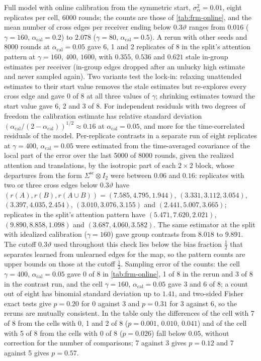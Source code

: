 \begin{numcheck}\label{chk:frm-online}
Full model with online calibration from the symmetric start, $\sigma_\alpha^2=0.01$, eight replicates per cell, 6000 rounds; the counts are those of \cref{tab:frm-online}, and the mean number of cross edges per receiver ending below $0.3\vartheta$ ranges from $0.016$ ($\gamma=160$, $\alpha_{\mathrm{cal}}=0.2$) to $2.078$ ($\gamma=80$, $\alpha_{\mathrm{cal}}=0.5$). A rerun with other seeds and 8000 rounds at $\alpha_{\mathrm{cal}}=0.05$ gave 6, 1 and 2 replicates of 8 in the split's attention pattern at $\gamma=160$, $400$, $1600$, with $0.355$, $0.536$ and $0.621$ stale in-group estimates per receiver (in-group edges dropped after an unlucky high estimate and never sampled again). Two variants test the lock-in: relaxing unattended estimates to their start value removes the stale estimates but re-explores every cross edge and gave 0 of 8 at all three values of $\gamma$; shrinking estimates toward the start value gave 6, 2 and 3 of 8. For independent residuals with two degrees of freedom the calibration estimate has relative standard deviation $(\alpha_{\mathrm{cal}}/(2-\alpha_{\mathrm{cal}}))^{1/2}\approx0.16$ at $\alpha_{\mathrm{cal}}=0.05$, and more for the time-correlated residuals of the model. Per-replicate contrasts in a separate run of eight replicates at $\gamma=400$, $\alpha_{\mathrm{cal}}=0.05$ were estimated from the time-averaged covariance of the local part of the error over the last 5000 of 8000 rounds, given the realized attention and translations, by the isotropic part of each $2\times2$ block, whose departures from the form $\Sigma^{\mathrm{sc}}\otimes I_2$ were between $0.06$ and $0.16$: replicates with two or three cross edges below $0.3\vartheta$ have $(r(A),r(B),r(A\cup B))=(7.585,4.795,1.944)$, $(3.331,3.112,3.054)$, $(3.397,4.035,2.454)$, $(3.010,3.076,3.155)$ and $(2.441,5.007,3.665)$; replicates in the split's attention pattern have $(5.471,7.620,2.021)$, $(9.890,8.858,1.098)$ and $(3.687,4.060,3.582)$. The same estimator at the split with idealized calibration ($\gamma=160$) gave group contrasts from $8.018$ to $9.891$. The cutoff $0.3\vartheta$ used throughout this check lies below the bias fraction $\frac12$ that separates learned from unlearned edges for the map, so the pattern counts are upper bounds on those at the cutoff $\frac12$. Sampling error of the counts: the cell $\gamma=400$, $\alpha_{\mathrm{cal}}=0.05$ gave 0 of 8 in \cref{tab:frm-online}, 1 of 8 in the rerun and 3 of 8 in the contrast run, and the cell $\gamma=160$, $\alpha_{\mathrm{cal}}=0.05$ gave 3 and 6 of 8; a count out of eight has binomial standard deviation up to $1.41$, and two-sided Fisher exact tests give $p=0.20$ for 0 against 3 and $p=0.31$ for 3 against 6, so the reruns are mutually consistent. In the table only the differences of the cell with 7 of 8 from the cells with 0, 1 and 2 of 8 ($p=0.001$, $0.010$, $0.041$) and of the cell with 5 of 8 from the cells with 0 of 8 ($p=0.026$) fall below $0.05$, without correction for the number of comparisons; 7 against 3 gives $p=0.12$ and 7 against 5 gives $p=0.57$.
\end{numcheck}

